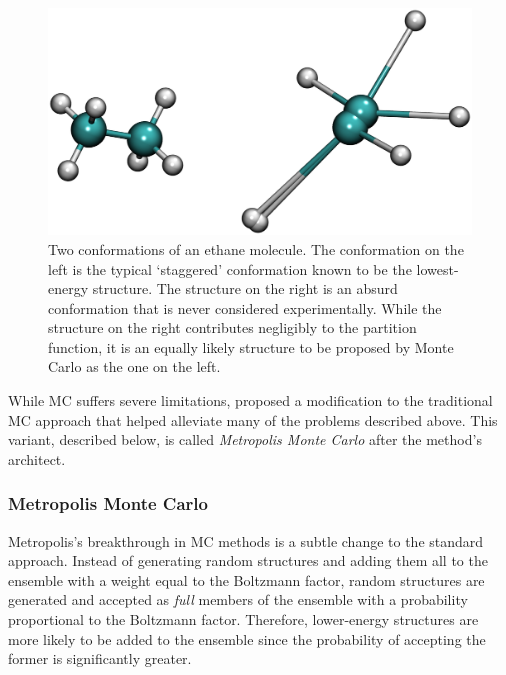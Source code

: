 \begin{figure}
   \includegraphics[width=6.5in]{EthaneMC.ps}
   \caption[Two conformations of an ethane molecule. The conformation on the
            left is the typical `staggered' conformation]
           {Two conformations of an ethane molecule. The conformation on the
            left is the typical `staggered' conformation known to be the
            lowest-energy structure. The structure on the right is an absurd
            conformation that is never considered experimentally. While the
            structure on the right contributes negligibly to the partition
            function, it is an equally likely structure to be proposed by Monte
            Carlo as the one on the left.}
   \label{fig1:EthaneMC}
\end{figure}

While MC suffers severe limitations,
\citeauthor{Metropolis_JChemPhys_1953_v21_p1087} proposed a modification to the
traditional MC approach that helped alleviate many of the problems described
above. \cite{Metropolis_JChemPhys_1953_v21_p1087} This variant, described below,
is called \emph{Metropolis Monte Carlo} after the method's architect.

\subsubsection*{Metropolis Monte Carlo}

Metropolis's breakthrough in MC methods is a subtle change to the standard
approach. Instead of generating random structures and adding them all to the
ensemble with a weight equal to the Boltzmann factor, random structures are
generated and accepted as \emph{full} members of the ensemble with a probability
proportional to the Boltzmann factor. Therefore, lower-energy structures are
more likely to be added to the ensemble since the probability of accepting the
former is significantly greater.

